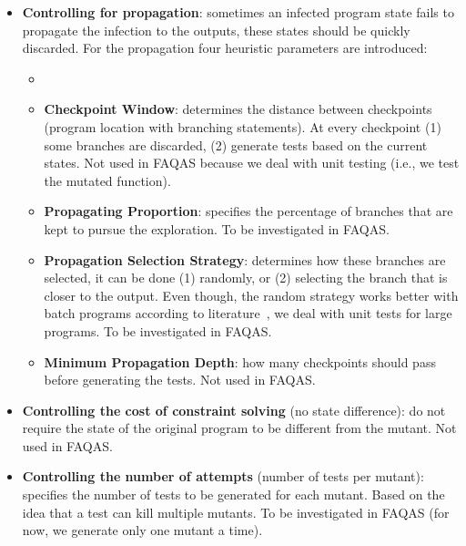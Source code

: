 \begin{itemize}
	\item \textbf{Controlling for propagation}: sometimes an infected program state fails to propagate the infection to the outputs, these states should be quickly discarded. 
	For the propagation four heuristic parameters are introduced:
	\begin{itemize}
	\item {}
		\item \textbf{Checkpoint Window}: determines the distance between checkpoints (program location with branching statements). 
		At every checkpoint (1) some branches are discarded, (2) generate tests based on the current states. Not used in FAQAS because we deal with unit testing (i.e., we test the mutated function).
		\item \textbf{Propagating Proportion}: specifies the percentage of branches that are kept to pursue the exploration. To be investigated in FAQAS.
		\item \textbf{Propagation Selection Strategy}: determines how these branches are selected, it can be done (1) randomly, or (2) selecting the branch that is closer to the output. Even though, the random strategy works better with batch programs according to literature~\cite{chekam2021killing}, we deal with unit tests for large programs. To be investigated in FAQAS. 
	\item \textbf{Minimum Propagation Depth}: how many checkpoints should pass before generating the tests. Not used in FAQAS.
	\end{itemize}

	\item \textbf{Controlling the cost of constraint solving} (no state difference): do not require the state of the original program to be different from the mutant. Not used in FAQAS.

	\item \textbf{Controlling the number of attempts} (number of tests per mutant): specifies the number of tests to be generated for each mutant. Based on the idea that a test can kill multiple mutants. To be investigated in FAQAS (for now, we generate only one mutant a time).

\end{itemize}

\ENDCHANGEDWPT


